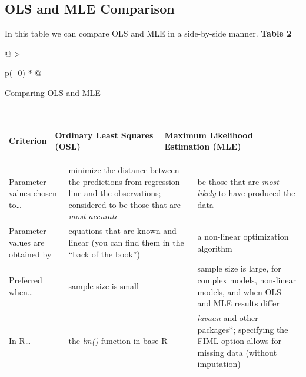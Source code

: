\documentclass[
]{book}
\begin{document}
\hypertarget{ols-and-mle-comparison}{%
\subsection{OLS and MLE Comparison}\label{ols-and-mle-comparison}}

In this table we can compare OLS and MLE in a side-by-side manner.
\textbf{Table 2}

\begin{longtable}[]{@{}
  >{\raggedright\arraybackslash}p{(\columnwidth - 0\tabcolsep) * }@{}}
\toprule
\begin{minipage}[b]{\linewidth}\raggedright
Comparing OLS and MLE \citep{cohen_applied_2003, myung_tutorial_2003}
\end{minipage} \\
\midrule
\endhead
\bottomrule
\end{longtable}

\begin{longtable}[]{@{}
  >{\centering\arraybackslash}p{}
  >{\centering\arraybackslash}p{}
  >{\centering\arraybackslash}p{}@{}}
\toprule
\endhead
\textbf{Criterion} & \textbf{Ordinary Least Squares (OSL)} & \textbf{Maximum Likelihood Estimation (MLE)} \\
\bottomrule
\end{longtable}

\begin{longtable}[]{@{}
  >{\centering\arraybackslash}p{}
  >{\centering\arraybackslash}p{}
  >{\centering\arraybackslash}p{}@{}}
\toprule
\endhead
Parameter values chosen to\ldots{} & minimize the distance between the predictions from regression line and the observations; considered to be those that are \emph{most accurate} & be those that are \emph{most likely} to have produced the data \\
Parameter values are obtained by & equations that are known and linear (you can find them in the ``back of the book'') & a non-linear optimization algorithm \\
Preferred when\ldots{} & sample size is small & sample size is large, for complex models, non-linear models, and when OLS and MLE results differ \\
In R\ldots{} & the \emph{lm()} function in base R & \emph{lavaan} and other packages*; specifying the FIML option allows for missing data (without imputation) \\
\bottomrule
\end{longtable}
\end{document}
